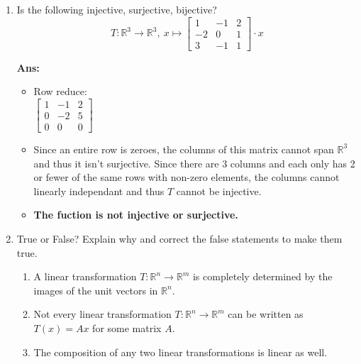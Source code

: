 \documentclass[12pt,a4paper]{amsart}
\newcommand{\R}{\mathbb{R}}
\newcommand\sol[1]{
\medskip
\begin{mdframed}
\textbf{Ans:\\} #1
\end{mdframed}
\medskip
}
\begin{document}
\begin{enumerate}
\sol{
  The matrix is already in echelon form. If we put it in reduced echelon form we get this: $\left[\begin{matrix} 0 & 1 & 0 \\ 0 & 0 & 1 \end{matrix}\right]$\\
  The columns of the matrix are the zero vector and unit vectors of $\R^2$, which of course span $\R^2$. This means that the function is surjective. Because one of the columns is the zero vector, the vectors cannot be linearly independant. Therefore the function $T$ is only Surjective. Since the function is surjective, the range is the codomain which is $\R^2$.
};

\item
 Is the following injective, surjective, bijective? %
\[ T:\R^3\to\R^3,\ x \mapsto \left[\begin{matrix} 1 & -1 & 2 \\ -2 & 0 & 1 \\ 3 & -1 & 1 \end{matrix}\right]\cdot x \]

\sol{
  \begin{itemize}
    \item
      Row reduce:\\
      $\left[\begin{matrix} 1 & -1 & 2 \\ 0 & -2 & 5 \\ 0 & 0 & 0 \end{matrix}\right]$
    \item
      Since an entire row is zeroes, the columns of this matrix cannot span $\R^3$ and thus it isn't surjective. Since there are 3 columns and each only has 2 or fewer of the same rows with non-zero elements, the columns cannot linearly independant and thus $T$ cannot be injective.
    \item
      \textbf{The fuction is not injective or surjective.}
  \end{itemize}
}

\item %
  True or False? Explain why and correct the false statements to make them true.
\begin{enumerate}
\item
 A linear transformation $T\colon\R^n\to\R^m$ is completely determined by the images of the unit vectors
 in $\R^n$.
\item
 Not every linear transformation $T\colon\R^n\to\R^m$ can be written as $T(x)=Ax$ for some matrix $A$.
\item
 The composition of any two linear transformations is linear as well.
\end{enumerate}



\end{enumerate}
\end{document}
